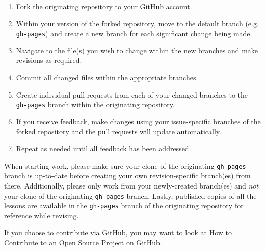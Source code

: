 \documentclass[]{book}
\providecommand{\tightlist}{%
  \setlength{\itemsep}{0pt}\setlength{\parskip}{0pt}}
\begin{document}
\begin{enumerate}
\def\labelenumi{\arabic{enumi}.}
\tightlist
\item
  Fork the originating repository to your GitHub account.
\item
  Within your version of the forked repository, move to the
  default branch (e.g. \texttt{gh-pages}) and
  create a new branch for each significant change being made.
\item
  Navigate to the file(s) you wish to change within the new branches and make revisions as required.
\item
  Commit all changed files within the appropriate branches.
\item
  Create individual pull requests from each of your changed branches
  to the \texttt{gh-pages} branch within the originating repository.
\item
  If you receive feedback, make changes using your issue-specific branches of the forked
  repository and the pull requests will update automatically.
\item
  Repeat as needed until all feedback has been addressed.
\end{enumerate}

When starting work, please make sure your clone of the originating \texttt{gh-pages} branch is up-to-date
before creating your own revision-specific branch(es) from there.
Additionally, please only work from your newly-created branch(es) and \emph{not}
your clone of the originating \texttt{gh-pages} branch.
Lastly, published copies of all the lessons are available in the \texttt{gh-pages} branch of the originating
repository for reference while revising.

If you choose to contribute via GitHub, you may want to look at
\href{https://egghead.io/series/how-to-contribute-to-an-open-source-project-on-github}{How to Contribute to an Open Source Project on GitHub}.


\end{document}
